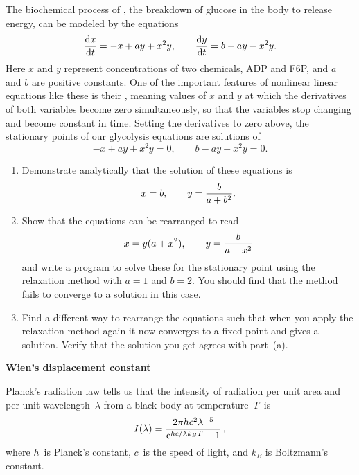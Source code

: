 \documentclass[12pt]{article}
\begin{document}
\begin{exercises}

\exercise The biochemical process of , the
  breakdown of glucose in the body to release energy, can be modeled by the
  equations
\begin{displaymath}
{\mathrm{d}x\over\mathrm{d}t} = -x + ay + x^2 y, \qquad
{\mathrm{d}y\over\mathrm{d}t} = b - ay - x^2 y.
\end{displaymath}
Here $x$ and $y$ represent concentrations of two chemicals, ADP and F6P,
and $a$ and $b$ are positive constants.  One of the important features of
nonlinear linear equations like these is their , meaning values of $x$ and $y$ at which the derivatives of both
variables become zero simultaneously, so that the variables stop changing
and become constant in time.  Setting the derivatives to zero above, the
stationary points of our glycolysis equations are solutions of
\begin{displaymath}
-x + ay + x^2 y = 0, \qquad b - ay - x^2 y = 0.
\end{displaymath}
\begin{enumerate}\setlength{\itemsep}{0pt}
\item Demonstrate analytically that the solution of these equations is
\begin{displaymath}
x = b,\qquad y = {b\over a+b^2}.
\end{displaymath}
\item Show that the equations can be rearranged to read
\begin{displaymath}
x = y(a+x^2),\qquad y = {b\over a+x^2}
\end{displaymath}
and write a program to solve these for the stationary point using the
relaxation method with $a=1$ and $b=2$.  You should find that the method
fails to converge to a solution in this case.
\item Find a different way to rearrange the equations such that when you
  apply the relaxation method again it now converges to a fixed point and
  gives a solution.  Verify that the solution you get agrees with part~(a).
\end{enumerate}



\exercise \textbf{Wien's displacement constant}

\exskip Planck's radiation law tells us that
the intensity of radiation per unit area and per unit wavelength~$\lambda$
from a black body at temperature~$T$~is
\begin{displaymath}
  I(\lambda) = {2\pi hc^2\lambda^{-5}\over\mathrm{e}^{hc/\lambda k_BT}-1}\,,
\end{displaymath}
where $h$~is Planck's constant, $c$~is the speed of light, and $k_B$ is
Boltzmann's constant.


\end{exercises}
\end{document}
